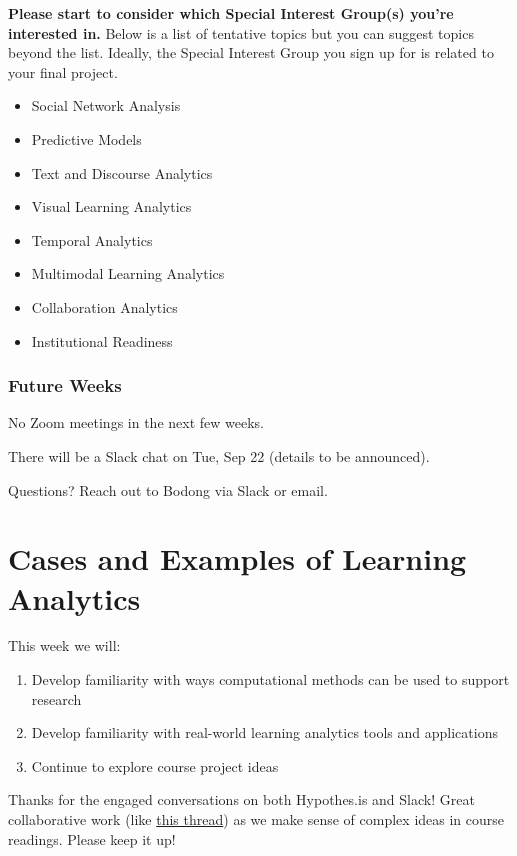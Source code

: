 \documentclass[
]{book}
\providecommand{\tightlist}{%
  \setlength{\itemsep}{0pt}\setlength{\parskip}{0pt}}
\begin{document}
\textbf{Please start to consider which Special Interest Group(s) you're interested in.} Below is a list of tentative topics but you can suggest topics beyond the list. Ideally, the Special Interest Group you sign up for is related to your final project.

\begin{itemize}
\tightlist
\item
  Social Network Analysis
\item
  Predictive Models
\item
  Text and Discourse Analytics
\item
  Visual Learning Analytics
\item
  Temporal Analytics
\item
  Multimodal Learning Analytics
\item
  Collaboration Analytics
\item
  Institutional Readiness
\end{itemize}

\hypertarget{future-weeks}{%
\subsection{Future Weeks}\label{future-weeks}}

No Zoom meetings in the next few weeks.

There will be a Slack chat on Tue, Sep 22 (details to be announced).

Questions? Reach out to Bodong via Slack or email.

\hypertarget{cases-and-examples-of-learning-analytics}{%
\chapter{Cases and Examples of Learning Analytics}\label{cases-and-examples-of-learning-analytics}}

This week we will:

\begin{enumerate}
\def\labelenumi{\arabic{enumi}.}
\tightlist
\item
  Develop familiarity with ways computational methods can be used to support research
\item
  Develop familiarity with real-world learning analytics tools and applications
\item
  Continue to explore course project ideas
\end{enumerate}

Thanks for the engaged conversations on both Hypothes.is and Slack! Great collaborative work (like \href{https://hyp.is/NFor1vhTEeq9wSM8TXN_OQ/www.solaresearch.org/wp-content/uploads/2017/05/chapter4.pdf}{this thread}) as we make sense of complex ideas in course readings. Please keep it up!
\end{document}
